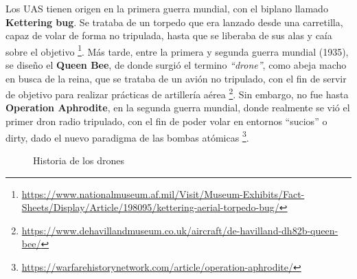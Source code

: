 Los \ac{UAS} tienen origen en la primera guerra mundial, con el biplano llamado \textbf{Kettering bug}. Se trataba de un torpedo que era lanzado desde una carretilla, capaz de volar de forma no tripulada, hasta que se liberaba de sus alas y caía sobre el objetivo \footnote[7]{\url{https://www.nationalmuseum.af.mil/Visit/Museum-Exhibits/Fact-Sheets/Display/Article/198095/kettering-aerial-torpedo-bug/}}. Más tarde, entre la primera y segunda guerra mundial (1935), se diseño el \textbf{Queen Bee}, de donde surgió el termino \emph{``drone''}, como abeja macho en busca de la reina, que se trataba de un avión no tripulado, con el fin de servir de objetivo para realizar prácticas de artillería aérea \footnote[8]{\url{https://www.dehavillandmuseum.co.uk/aircraft/de-havilland-dh82b-queen-bee/}}. Sin embargo, no fue hasta \textbf{Operation Aphrodite}, en la segunda guerra mundial, donde realmente se vió el primer dron radio tripulado, con el fin de poder volar en entornos ``sucios'' o dirty, dado el nuevo paradigma de las bombas atómicas \footnote[9]{\url{https://warfarehistorynetwork.com/article/operation-aphrodite/}}.\\

\begin{figure} [h]
	\centering
	\quad
	\quad
	\caption{Historia de los drones}
	\label{fig:drone_history}
\end{figure}

